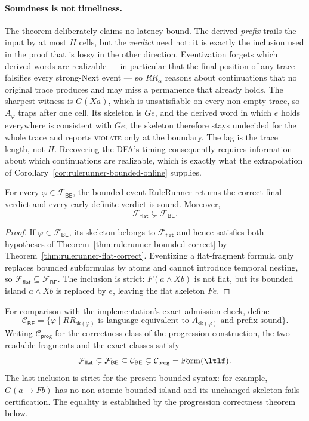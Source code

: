 \paragraph{Soundness is not timeliness.}
The theorem deliberately claims no latency bound.  The derived \emph{prefix}
trails the input by at most $H$ cells, but the \emph{verdict} need not: it is
exactly the inclusion used in the proof that is lossy in the other direction.
Eventization forgets which derived words are realizable --- in particular that
the final position of any trace falsifies every strong-Next event --- so
$RR_\alpha$ reasons about continuations that no original trace produces and may
miss a permanence that already holds.  The sharpest witness is $G(Xa)$, which is
unsatisfiable on every non-empty trace, so $A_\varphi$ traps after one cell.
Its skeleton is $Ge$, and the derived word in which $e$ holds everywhere is
consistent with $Ge$; the skeleton therefore stays undecided for the whole trace
and reports \textsc{violate} only at the boundary.  The lag is the trace length,
not $H$.  Recovering the DFA's timing consequently requires information about
which continuations are realizable, which is exactly what the extrapolation of
Corollary~\ref{cor:rulerunner-bounded-online} supplies.


\begin{corollary}
\label{cor:rulerunner-bounded-fragment}
For every $\varphi\in\mathcal F_{\mathsf{BE}}$, the bounded-event RuleRunner
returns the correct final verdict and every early definite verdict is sound.
Moreover,
\[
    \mathcal F_{\mathsf{flat}}
    \subsetneq
    \mathcal F_{\mathsf{BE}}.
\]
\end{corollary}

\begin{proof}
If $\varphi\in\mathcal F_{\mathsf{BE}}$, its skeleton belongs to
$\mathcal F_{\mathsf{flat}}$ and hence satisfies both hypotheses of
Theorem~\ref{thm:rulerunner-bounded-correct} by
Theorem~\ref{thm:rulerunner-flat-correct}.  Eventizing a flat-fragment formula
only replaces bounded subformulas by atoms and cannot introduce temporal
nesting, so
$\mathcal F_{\mathsf{flat}}\subseteq\mathcal F_{\mathsf{BE}}$.  The inclusion
is strict: $F(a\land Xb)$ is not flat, but its bounded island
$a\land Xb$ is replaced by $e$, leaving the flat skeleton $Fe$.
\end{proof}

For comparison with the implementation's exact admission check, define
\[
    \mathcal C_{\mathsf{BE}}
    = \{\varphi \mid RR_{\mathsf{sk}(\varphi)}
       \text{ is language-equivalent to }A_{\mathsf{sk}(\varphi)}
       \text{ and prefix-sound}\}.
\]
Writing $\mathcal C_{\mathsf{prog}}$ for the correctness class of the
progression construction, the two readable fragments and the exact classes
satisfy
\[
    \mathcal F_{\mathsf{flat}}
    \subsetneq \mathcal F_{\mathsf{BE}}
    \subseteq \mathcal C_{\mathsf{BE}}
    \subsetneq \mathcal C_{\mathsf{prog}}
    = \mathrm{Form}(\ltlf).
\]
The last inclusion is strict for the present bounded syntax: for example,
$G(a\to Fb)$ has no non-atomic bounded island and its unchanged skeleton fails
certification.  The equality is established by the progression correctness
theorem below.

